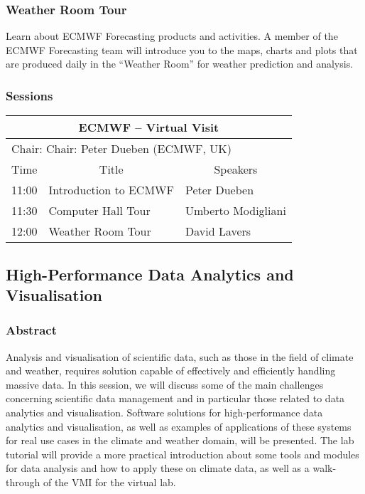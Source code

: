 \subsubsection{Weather Room Tour}

Learn about ECMWF Forecasting products and activities. A member of the ECMWF Forecasting team will introduce you to the maps, charts and plots that are produced daily in the ``Weather Room'' for weather prediction and analysis.

\subsubsection{Sessions}

\begin{table}[H]
\begin{center}
\begin{tabular}{|l|l|l|}
\hline
\multicolumn{3}{|c|}{\textbf{ECMWF -- Virtual Visit}} \\ \hline
\multicolumn{3}{|l|}{Chair: Chair: Peter Dueben (ECMWF, UK)} \\ \hline \hline
Time & \multicolumn{1}{c|}{Title} & \multicolumn{1}{c|}{Speakers} \\ \hline \hline
11:00 & Introduction to ECMWF & Peter Dueben \\ \hline
11:30 & Computer Hall Tour & Umberto Modigliani \\ \hline
12:00 & Weather Room Tour & David Lavers \\ \hline
\hline
\end{tabular}
\end{center}
\end{table}

\subsection{High-Performance Data Analytics and Visualisation}

\subsubsection{Abstract}

Analysis and visualisation of scientific data, such as those in the field of climate and weather, requires solution capable of effectively and efficiently handling massive data. In this session, we will discuss some of the main challenges concerning scientific data management and in particular those related to data analytics and visualisation. Software solutions for high-performance data analytics and visualisation, as well as examples of applications of these systems for real use cases in the climate and weather domain, will be presented. The lab tutorial will provide a more practical introduction about some tools and modules for data analysis and how to apply these on climate data, as well as a walk-through of the VMI for the virtual lab.

